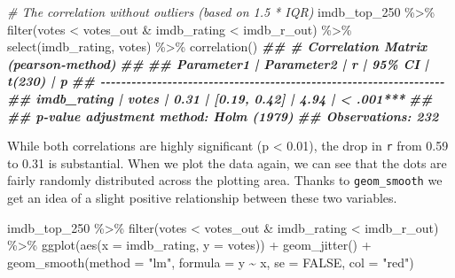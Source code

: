 \documentclass[
]{book}
\newenvironment{Shaded}{\begin{snugshade}}{\end{snugshade}}
\newcommand{\AttributeTok}[1]{\textcolor[rgb]{0.77,0.63,0.00}{#1}}
\newcommand{\CommentTok}[1]{\textcolor[rgb]{0.56,0.35,0.01}{\textit{#1}}}
\newcommand{\ConstantTok}[1]{\textcolor[rgb]{0.00,0.00,0.00}{#1}}
\newcommand{\DocumentationTok}[1]{\textcolor[rgb]{0.56,0.35,0.01}{\textbf{\textit{#1}}}}
\newcommand{\FunctionTok}[1]{\textcolor[rgb]{0.00,0.00,0.00}{#1}}
\newcommand{\NormalTok}[1]{#1}
\newcommand{\SpecialCharTok}[1]{\textcolor[rgb]{0.00,0.00,0.00}{#1}}
\newcommand{\StringTok}[1]{\textcolor[rgb]{0.31,0.60,0.02}{#1}}
\begin{document}
\begin{Shaded}
\begin{Highlighting}[]
\CommentTok{\# The correlation without outliers (based on 1.5 * IQR)}
\NormalTok{imdb\_top\_250 }\SpecialCharTok{\%\textgreater{}\%}
  \FunctionTok{filter}\NormalTok{(votes }\SpecialCharTok{\textless{}}\NormalTok{  votes\_out }\SpecialCharTok{\&}\NormalTok{ imdb\_rating }\SpecialCharTok{\textless{}}\NormalTok{ imdb\_r\_out) }\SpecialCharTok{\%\textgreater{}\%}
  \FunctionTok{select}\NormalTok{(imdb\_rating, votes) }\SpecialCharTok{\%\textgreater{}\%}
  \FunctionTok{correlation}\NormalTok{()}
\DocumentationTok{\#\# \# Correlation Matrix (pearson{-}method)}
\DocumentationTok{\#\# }
\DocumentationTok{\#\# Parameter1  | Parameter2 |    r |       95\% CI | t(230) |         p}
\DocumentationTok{\#\# {-}{-}{-}{-}{-}{-}{-}{-}{-}{-}{-}{-}{-}{-}{-}{-}{-}{-}{-}{-}{-}{-}{-}{-}{-}{-}{-}{-}{-}{-}{-}{-}{-}{-}{-}{-}{-}{-}{-}{-}{-}{-}{-}{-}{-}{-}{-}{-}{-}{-}{-}{-}{-}{-}{-}{-}{-}{-}{-}{-}{-}{-}{-}{-}{-}{-}{-}}
\DocumentationTok{\#\# imdb\_rating |      votes | 0.31 | [0.19, 0.42] |   4.94 | \textless{} .001***}
\DocumentationTok{\#\# }
\DocumentationTok{\#\# p{-}value adjustment method: Holm (1979)}
\DocumentationTok{\#\# Observations: 232}
\end{Highlighting}
\end{Shaded}

While both correlations are highly significant (p \textless{} 0.01), the drop in \texttt{r} from 0.59 to 0.31 is substantial. When we plot the data again, we can see that the dots are fairly randomly distributed across the plotting area. Thanks to \texttt{geom\_smooth} we get an idea of a slight positive relationship between these two variables.

\begin{Shaded}
\begin{Highlighting}[]
\NormalTok{imdb\_top\_250 }\SpecialCharTok{\%\textgreater{}\%}
  \FunctionTok{filter}\NormalTok{(votes }\SpecialCharTok{\textless{}}\NormalTok{  votes\_out }\SpecialCharTok{\&}\NormalTok{ imdb\_rating }\SpecialCharTok{\textless{}}\NormalTok{ imdb\_r\_out) }\SpecialCharTok{\%\textgreater{}\%}
  \FunctionTok{ggplot}\NormalTok{(}\FunctionTok{aes}\NormalTok{(}\AttributeTok{x =}\NormalTok{ imdb\_rating, }\AttributeTok{y =}\NormalTok{ votes)) }\SpecialCharTok{+}
  \FunctionTok{geom\_jitter}\NormalTok{() }\SpecialCharTok{+}
  \FunctionTok{geom\_smooth}\NormalTok{(}\AttributeTok{method =} \StringTok{"lm"}\NormalTok{,}
              \AttributeTok{formula =}\NormalTok{ y }\SpecialCharTok{\textasciitilde{}}\NormalTok{ x,}
              \AttributeTok{se =} \ConstantTok{FALSE}\NormalTok{,}
              \AttributeTok{col =} \StringTok{"red"}\NormalTok{)}
\end{Highlighting}
\end{Shaded}
\end{document}
